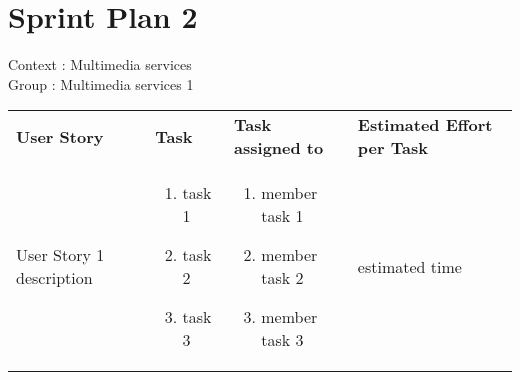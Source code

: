 \documentclass[11pt,a4paper]{article}
\begin{document}
\section*{Sprint Plan 2}
Context : Multimedia services\\
Group : Multimedia services 1\\



\begin{table}[h]
\begin{tabular}{|p{6cm}|p{5.5cm}|p{4cm}|p{3cm}|}
\textbf{User Story} & \textbf{Task} & \textbf{Task assigned to} & \textbf{Estimated Effort per Task} \\
User Story 1 description & \begin{enumerate}
\item task 1
\item task 2
\item task 3
\end{enumerate}

& 
\begin{enumerate}
\item member task 1
\item member task 2
\item member task 3
\end{enumerate}

& 
estimated time \\

           
\end{tabular}
\end{table}
\end{document}

